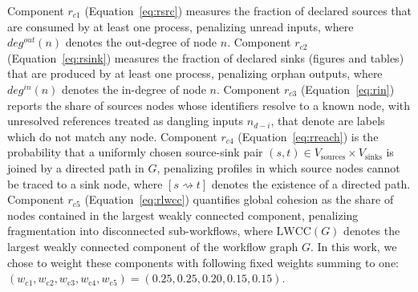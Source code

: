 \documentclass{article}
\begin{document}

Component $r_{c1}$ (Equation~\ref{eq:rsrc}) measures the fraction of declared sources that are consumed by at least one process, penalizing unread inputs, where $deg^{out}(n)$ denotes the out-degree of node $n$. 
Component $r_{c2}$ (Equation~\ref{eq:rsink}) measures the fraction of declared sinks (figures and tables) that are produced by at least one process, penalizing orphan outputs, where $deg^{in}(n)$ denotes the in-degree of node $n$.
Component $r_{c3}$ (Equation~\ref{eq:rin}) reports the share of sources nodes whose identifiers resolve to a known node, with unresolved references treated as dangling inputs $n_{d-i}$, that denote are labels which do not match any node. 
Component $r_{c4}$ (Equation~\ref{eq:rreach}) is the probability that a uniformly chosen source-sink pair $(s,t)\in V_{\text{sources}}\times V_{\text{sinks}}$ is joined by a directed path in $G$, penalizing profiles in which source nodes cannot be traced to a sink node, where $[s\rightsquigarrow t]$ denotes the existence of a directed path. 
Component $r_{c5}$ (Equation~\ref{eq:rlwcc}) quantifies global cohesion as the share of nodes contained in the largest weakly connected component, penalizing fragmentation into disconnected sub-workflows, where $\mathrm{LWCC}(G)$ denotes the largest weakly connected component of the workflow graph $G$.
In this work, we chose to weight these components with following fixed weights summing to one: $(w_{\mathrm{c1}},w_{\mathrm{c2}},w_{\mathrm{c3}},w_{\mathrm{c4}},w_{\mathrm{c5}}) = (0.25,0.25,0.20,0.15,0.15)$. %
\end{document}
